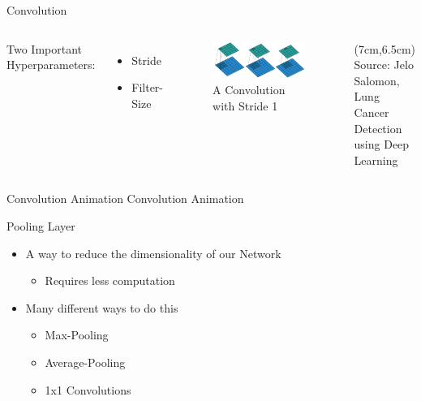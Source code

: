 \documentclass[citestyle=authoryear,bibstyle=numeric,hyperref,backend=biber]{sdqbeamer}
\begin{document}
\begin{frame}{Convolution}
\begin{columns}
    Two Important Hyperparameters:
    \begin{itemize}
        \item Stride
        \item Filter-Size
    \end{itemize}

    \begin{figure}
        \centering
        \includegraphics[width=1\textwidth]{pictures/stride1.jpg}
        \caption{A Convolution with Stride 1}
        \label{fig:stride1-conv}
    \end{figure}
    \begin{textblock*}{6cm}(7cm,6.5cm) %
             \tiny{Source: Jelo Salomon, Lung Cancer Detection using Deep Learning}
        \end{textblock*}
\end{columns}
\end{frame}


\begin{frame}{Convolution Animation}
Convolution Animation
\end{frame}

\begin{frame}{Pooling Layer}
    \begin{itemize}
        \item A way to reduce the dimensionality of our Network
        \begin{itemize}
            \item Requires less computation
        \end{itemize}
        \item Many different ways to do this
        \begin{itemize}
            \item Max-Pooling
            \item Average-Pooling
            \item 1x1 Convolutions
        \end{itemize}
    \end{itemize}
\end{frame}
\end{document}
